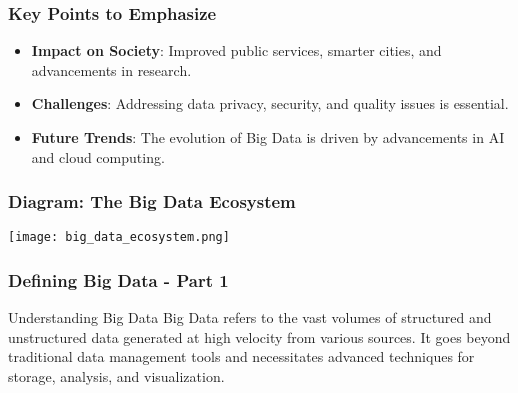 \documentclass[aspectratio=169]{beamer}
\begin{document}
\begin{frame}[fragile]
    \frametitle{Key Points to Emphasize}
    \begin{itemize}
        \item \textbf{Impact on Society}: Improved public services, smarter cities, and advancements in research.
        \item \textbf{Challenges}: Addressing data privacy, security, and quality issues is essential.
        \item \textbf{Future Trends}: The evolution of Big Data is driven by advancements in AI and cloud computing.
    \end{itemize}
\end{frame}

\begin{frame}[fragile]
    \frametitle{Diagram: The Big Data Ecosystem}
    \begin{center}
        \texttt{[image: big\_data\_ecosystem.png]} %
    \end{center}
\end{frame}

\begin{frame}[fragile]
    \frametitle{Defining Big Data - Part 1}
    \begin{block}{Understanding Big Data}
        Big Data refers to the vast volumes of structured and unstructured data generated at high velocity from various sources. It goes beyond traditional data management tools and necessitates advanced techniques for storage, analysis, and visualization.
    \end{block}
\end{frame}
\end{document}
